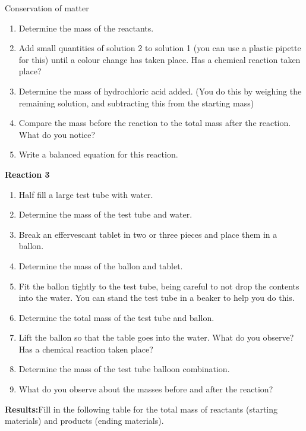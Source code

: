 \begin{i_experiment}{Conservation of matter}
\begin{enumerate}[noitemsep, label=\textbf{\arabic*}. ]
\item Determine the mass of the reactants.
\item Add small quantities of solution 2 to solution 1 (you can use a plastic pipette for this) until a colour change has taken place. Has a chemical reaction taken place?  
\item Determine the mass of hydrochloric acid added. (You do this by weighing the remaining solution, and subtracting this from the starting mass)
\item Compare the mass before the reaction to the total mass after the reaction. What do you notice?
\item Write a balanced equation for this reaction.
\end{enumerate}
\textbf{Reaction 3}
\label{m38711*id634223}\begin{enumerate}[noitemsep, label=\textbf{\arabic*}. ] 
\item Half fill a large test tube with water.
\item Determine the mass of the test tube and water.
\item Break an effervescant tablet in two or three pieces and place them in a ballon.
\item Determine the mass of the ballon and tablet.
\item Fit the ballon tightly to the test tube, being careful to not drop the contents into the water. You can stand the test tube in a beaker to help you do this.
\item Determine the total mass of the test tube and ballon.
\item Lift the ballon so that the table goes into the water. What do you observe? Has a chemical reaction taken place?
\item Determine the mass of the test tube balloon combination.
\item What do you observe about the masses before and after the reaction?
\end{enumerate}
        \par \label{m38711*eip-768}\noindent{}\textbf{Results:}Fill in the following table for the total mass of reactants (starting materials) and products (ending materials).  \par 
          \begin{table}[H]
        \begin{center}

\end{center}
\end{table}
\end{i_experiment}

